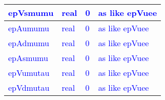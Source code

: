 \documentclass{article}
\begin{document}
\begin{longtable}{llll}
\midrule
\textcolor{blue}{epVsmumu} & \begin{minipage}[t]{2cm}\textcolor{blue}{real}\end{minipage} & \begin{minipage}[t]{2cm}\textcolor{blue}{0}\end{minipage} & \begin{minipage}[t]{12cm}\textcolor{blue}{as like epVuee}\end{minipage}\\*
\midrule
\textcolor{blue}{epAumumu} & \begin{minipage}[t]{2cm}\textcolor{blue}{real}\end{minipage} & \begin{minipage}[t]{2cm}\textcolor{blue}{0}\end{minipage} & \begin{minipage}[t]{12cm}\textcolor{blue}{as like epVuee}\end{minipage}\\*
\midrule
\textcolor{blue}{epAdmumu} & \begin{minipage}[t]{2cm}\textcolor{blue}{real}\end{minipage} & \begin{minipage}[t]{2cm}\textcolor{blue}{0}\end{minipage} & \begin{minipage}[t]{12cm}\textcolor{blue}{as like epVuee}\end{minipage}\\*
\midrule
\textcolor{blue}{epAsmumu} & \begin{minipage}[t]{2cm}\textcolor{blue}{real}\end{minipage} & \begin{minipage}[t]{2cm}\textcolor{blue}{0}\end{minipage} & \begin{minipage}[t]{12cm}\textcolor{blue}{as like epVuee}\end{minipage}\\*
\midrule
\textcolor{blue}{epVumutau} & \begin{minipage}[t]{2cm}\textcolor{blue}{real}\end{minipage} & \begin{minipage}[t]{2cm}\textcolor{blue}{0}\end{minipage} & \begin{minipage}[t]{12cm}\textcolor{blue}{as like epVuee}\end{minipage}\\*
\midrule
\textcolor{blue}{epVdmutau} & \begin{minipage}[t]{2cm}\textcolor{blue}{real}\end{minipage} & \begin{minipage}[t]{2cm}\textcolor{blue}{0}\end{minipage} & \begin{minipage}[t]{12cm}\textcolor{blue}{as like epVuee}\end{minipage}\\*

\end{longtable}
\end{document}
